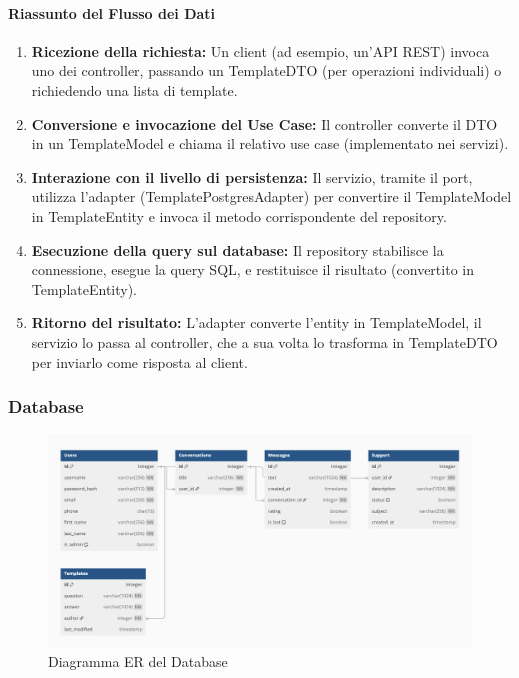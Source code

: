     \paragraph{Riassunto del Flusso dei Dati}
    \begin{enumerate}
        \item \textbf{Ricezione della richiesta:} Un client (ad esempio, un’API REST) invoca uno dei controller, passando un TemplateDTO (per operazioni individuali) o richiedendo una lista di template.
        \item \textbf{Conversione e invocazione del Use Case:} Il controller converte il DTO in un TemplateModel e chiama il relativo use case (implementato nei servizi).
        \item \textbf{Interazione con il livello di persistenza:} Il servizio, tramite il port, utilizza l’adapter (TemplatePostgresAdapter) per convertire il TemplateModel in TemplateEntity e invoca il metodo corrispondente del repository.
        \item \textbf{Esecuzione della query sul database:} Il repository stabilisce la connessione, esegue la query SQL, e restituisce il risultato (convertito in TemplateEntity).
        \item \textbf{Ritorno del risultato:} L’adapter converte l’entity in TemplateModel, il servizio lo passa al controller, che a sua volta lo trasforma in TemplateDTO per inviarlo come risposta al client.
    \end{enumerate}
    
    \subsubsection{Database}
    \begin{figure}[H]
        \centering
        \includegraphics[width=\linewidth, height=0.8\textheight, keepaspectratio]{./img/DB_ER.png}
        \caption{Diagramma ER del Database}
        \label{fig:db_er}
    \end{figure}

